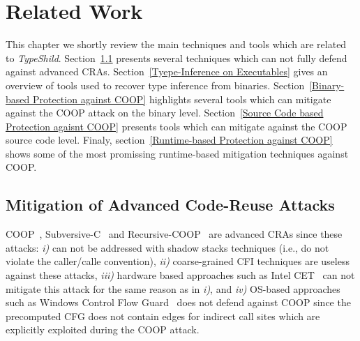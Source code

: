 \chapter{Related Work}
\label{chapter:Related_Work}
This chapter we shortly review the main techniques and tools which are related 
to \textit{TypeShild}. 
Section~\ref{Mitigation of Advanced Code-Reuse Attacks} presents 
several techniques which can not fully defend against advanced CRAs.
Section~\ref{Tyepe-Inference on Executables} gives an overview of tools used to
recover type inference from binaries.
Section~\ref{Binary-based Protection against COOP} highlights several tools which can
mitigate against the COOP attack on the binary level.
Section~\ref{Source Code based Protection agaisnt COOP} presents tools which can
mitigate against the COOP source code level.
Finaly, section~\ref{Runtime-based Protection against COOP} shows some of the most promissing 
runtime-based mitigation techniques against COOP.

\section{Mitigation of Advanced Code-Reuse Attacks}
\label{Mitigation of Advanced Code-Reuse Attacks}

COOP~\cite{schuster:coop}, Subversive-C~\cite{subversive-c:lettner} and Recursive-COOP~\cite{trap:crane} 
are advanced CRAs since these attacks:
\textit{i)} can not be addressed with shadow stacks techniques (i.e., do not violate the caller/calle convention), 
\textit{ii)} coarse-grained CFI techniques are useless against these attacks, 
\textit{iii)} hardware based approaches such as Intel CET~\cite{intel:cet} can not mitigate this attack for the same reason as in \textit{i)}, and 
\textit{iv)} OS-based approaches such as Windows Control Flow Guard~\cite{windows:cfguard} 
does not defend against COOP since the precomputed CFG does not contain edges for indirect call sites which are explicitly exploited
during the COOP attack.

